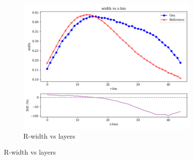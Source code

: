 \begin{figure}
\begin{subfigure}[b]{0.3\textwidth}
        \centering
        \includegraphics[width=\textwidth]{Figures/quantile4.png}
        \caption{R-width vs layers}
        \label{fig:quantile4}
    \end{subfigure}
    

    \vspace{0.35cm} %

    

\end{figure}
